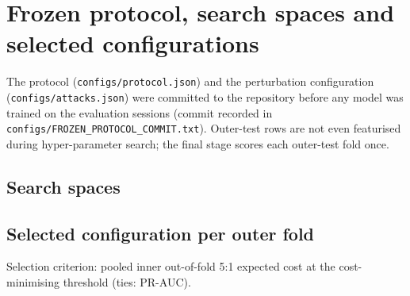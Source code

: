 \section{Frozen protocol, search spaces and selected configurations}
\label{sec:s-protocol}
The protocol (\texttt{configs/\allowbreak protocol.json}) and the perturbation configuration (\texttt{configs/\allowbreak attacks.json}) were committed to the repository before any model was trained on the evaluation sessions (commit recorded in \texttt{configs/\allowbreak FROZEN\_PROTOCOL\_COMMIT.txt}). Outer-test rows are not even featurised during hyper-parameter search; the final stage scores each outer-test fold once.

\subsection{Search spaces}
{\footnotesize}

\subsection{Selected configuration per outer fold}
Selection criterion: pooled inner out-of-fold 5:1 expected cost at the cost-minimising threshold (ties: PR-AUC).
{\footnotesize}
